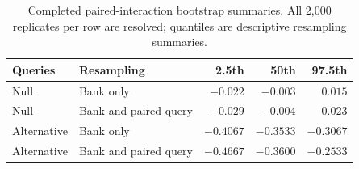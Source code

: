 \begin{table}[htbp]\centering
\caption{Completed paired-interaction bootstrap summaries. All 2,000 replicates per row are resolved; quantiles are descriptive resampling summaries.}\label{tab:f-completed-bootstrap}
\begin{tabular}{llrrr}\toprule
Queries & Resampling & 2.5th & 50th & 97.5th\\\midrule
Null & Bank only & $-0.022$ & $-0.003$ & $0.015$\\
Null & Bank and paired query & $-0.029$ & $-0.004$ & $0.023$\\
Alternative & Bank only & $-0.4067$ & $-0.3533$ & $-0.3067$\\
Alternative & Bank and paired query & $-0.4667$ & $-0.3600$ & $-0.2533$\\\bottomrule
\end{tabular}\end{table}
